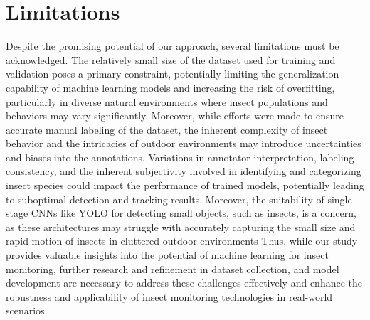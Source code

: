 \documentclass[sigchi,screen]{acmart}
\begin{document}
\section{Limitations}

Despite the promising potential of our approach, several limitations must be acknowledged. The relatively small size of the dataset used for training and validation poses a primary constraint, potentially limiting the generalization capability of machine learning models and increasing the risk of overfitting, particularly in diverse natural environments where insect populations and behaviors may vary significantly. Moreover, while efforts were made to ensure accurate manual labeling of the dataset, the inherent complexity of insect behavior and the intricacies of outdoor environments may introduce uncertainties and biases into the annotations. Variations in annotator interpretation, labeling consistency, and the inherent subjectivity involved in identifying and categorizing insect species could impact the performance of trained models, potentially leading to suboptimal detection and tracking results. 
Moreover, the suitability of single-stage CNNs like YOLO for detecting small objects, such as insects, is a concern, as these architectures may struggle with accurately capturing the small size and rapid motion of insects in cluttered outdoor environments
Thus, while our study provides valuable insights into the potential of machine learning for insect monitoring, further research and refinement in dataset collection, and model development are necessary to address these challenges effectively and enhance the robustness and applicability of insect monitoring technologies in real-world scenarios.
\end{document}
